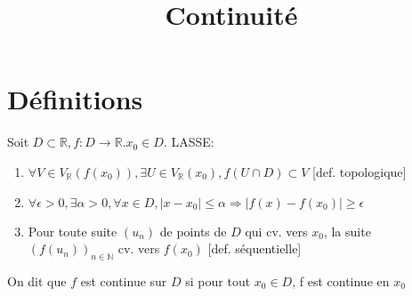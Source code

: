 \documentclass[fleqn]{article}
\title{Continuit\'e}
\date{}
\begin{document}
\maketitle

\section{D\'efinitions}
Soit $D \subset \mathbb{R}, f:D \rightarrow \mathbb{R}. x_0 \in D$. LASSE:
\begin{enumerate}
	\item $\forall V \in V_\mathbb{R}(f(x_0)), \exists U \in V_\mathbb{R}(x_0), f(U \cap D) \subset V$ [def. topologique]
	\item $\forall \epsilon>0, \exists \alpha > 0, \forall x \in D, |x-x_0| \leq \alpha \Rightarrow |f(x) - f(x_0)| \geq \epsilon$
	\item Pour toute suite $(u_n)$ de points de $D$ qui cv. vers $x_0$, la suite $(f(u_n))_{n\in\mathbb{N}}$ cv. vers $f(x_0)$ 
	[def. s\'equentielle]
\end{enumerate}
On dit que $f$ est continue sur $D$ si pour tout $x_0 \in D$, f est continue en $x_0$
\end{document}
